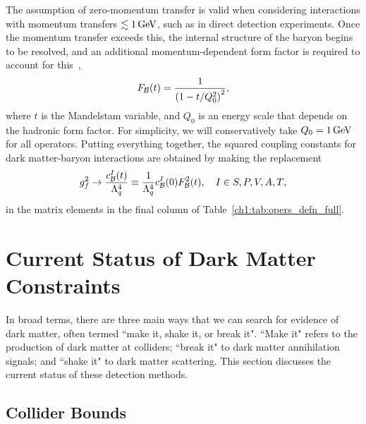 The assumption of zero-momentum transfer is valid when considering interactions with momentum transfers $\lesssim 1{\rm \,GeV}$, such as in direct detection experiments. Once the momentum transfer exceeds this, the internal structure of the baryon begins to be resolved, and an additional momentum-dependent form factor is required to account for this~\cite{_ElectromagneticStructureNucleon},
\begin{equation}
    F_{\cal B}(t) = \frac{1}{\left( 1 - t/Q_0^2\right)^2},
\end{equation}
where $t$ is the Mandelstam variable, and $Q_0$ is an energy scale that depends on the hadronic form factor. For simplicity, we will conservatively take $Q_0 = 1 {\rm \,GeV}$ for all operators.
Putting everything together, the squared coupling constants for dark matter-baryon interactions are obtained by making the replacement
\begin{equation}
    g_f^2 \rightarrow \frac{c^I_{\cal B}(t)}{\Lambda_q^4} \equiv \frac{1}{\Lambda_q^4}c_{\cal B}^I(0)F^2_{\cal B}(t),\quad I\in {S, P, V, A, T},
\end{equation}
in the matrix elements in the final column of Table~\ref{ch1:tab:opers_defn_full}.



\section{Current Status of Dark Matter Constraints}

In broad terms, there are three main ways that we can search for evidence of dark matter, often termed ``make it, shake it, or break it". ``Make it" refers to the production of dark matter at colliders; ``break it" to dark matter annihilation signals; and ``shake it" to dark matter scattering. 
This section discusses the current status of these detection methods. 


\subsection{Collider Bounds}


